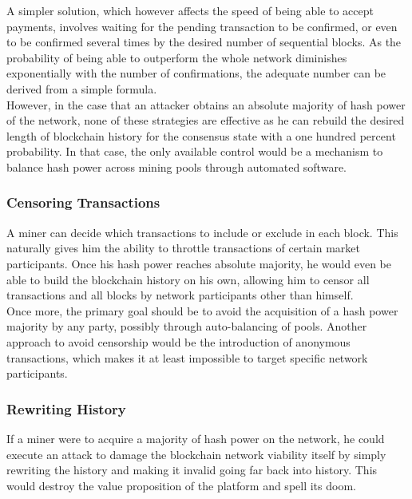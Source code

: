 \documentclass[11pt,a4paper,draft]{article}
\begin{document}
A simpler solution, which however affects the speed of being able to accept payments, involves waiting for the pending transaction to be confirmed, or even to be confirmed several times by the desired number of sequential blocks. As the probability of being able to outperform the whole network diminishes exponentially with the number of confirmations, the adequate number can be derived from a simple formula.\\

However, in the case that an attacker obtains an absolute majority of hash power of the network, none of these strategies are effective as he can rebuild the desired length of blockchain history for the consensus state with a one hundred percent probability. In that case, the only available control would be a mechanism to balance hash power across mining pools through automated software.\\

\subsubsection{Censoring Transactions}

A miner can decide which transactions to include or exclude in each block. This naturally gives him the ability to throttle transactions of certain market participants. Once his hash power reaches absolute majority, he would even be able to build the blockchain history on his own, allowing him to censor all transactions and all blocks by network participants other than himself.\\

Once more, the primary goal should be to avoid the acquisition of a hash power majority by any party, possibly through auto-balancing of pools. Another approach to avoid censorship would be the introduction of anonymous transactions, which makes it at least impossible to target specific network participants.\\

\subsubsection{Rewriting History}

If a miner were to acquire a majority of hash power on the network, he could execute an attack to damage the blockchain network viability itself by simply rewriting the history and making it invalid going far back into history. This would destroy the value proposition of the platform and spell its doom.\\
\end{document}
